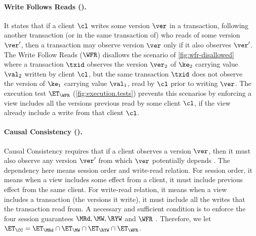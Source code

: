 \paragraph{Write Follows Reads (\WFR).}
It states that if a client \( \cl \) writes some version $\ver$ in a transaction,
following  another transaction (or in the same transaction of) who reads of some version $\ver'$, 
then a transaction may observe version $\ver$ only if it also observes $\ver'$. 
The Write Follow Reads ($\WFR$) disallows the scenario of \cref{fig:wfr-disallowed} 
where a transaction $\txid$ observes the version $\ver_2$ of $\ke_2$ carrying value $\val_2$ written by client $\cl$,
but the same transaction $\txid$ does not observe the version of $\ke_1$ carrying value $\val_1$, read by $\cl$ prior to writing $\ver$. 
The execution test $\ET_{\WFR}$ (\cref{fig:execution.tests}) prevents this scenarios 
by enforcing a view includes all the versions previous read by some client \( \cl \), 
if the view already include a write from that client \( \cl \).

\paragraph{Causal Consistency (\CC).}
Causal Consistency requires that if a client observes a version $\ver$, 
then it must also observe any version $\ver'$ from which $\ver$ potentially depends \cite{cops}. 
The dependency here means session order and write-read relation.
For session order, it means when a view includes some effect from a client, 
it must include previous effect from the same client.
For write-read relation, it means when a view includes a transaction (the versions it write),
it must include all the writes that the transaction read from.
A necessary and sufficient condition is to enforce the four session guarantees $\MRd, \MW, \RYW$ and $\WFR$ \cite{session2causal}.
Therefore, we let $\ET_{\CC} = \ET_{\MRd} \cap \ET_{\MW} \cap \ET_{\RYW} \cap \ET_{\WFR}$. 

